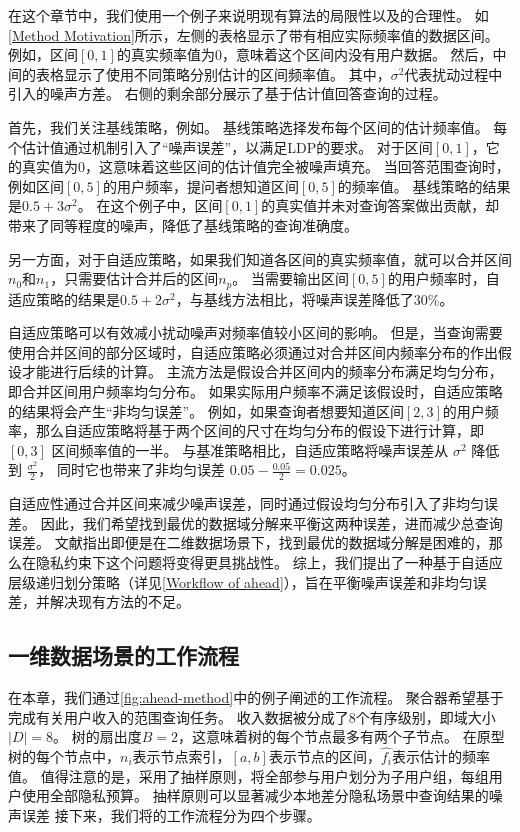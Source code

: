 在这个章节中，我们使用一个例子来说明现有算法的局限性以及\myahead 的合理性。
如\autoref{Method Motivation}所示，左侧的表格显示了带有相应实际频率值的数据区间。
例如，区间$[0,1]$的真实频率值为$0$，意味着这个区间内没有用户数据。
然后，中间的表格显示了使用不同策略分别估计的区间频率值。
其中，$\sigma^2$代表扰动过程中引入的噪声方差。
右侧的剩余部分展示了基于估计值回答查询的过程。

首先，我们关注基线策略，例如\myhio。
基线策略选择发布每个区间的估计频率值。
每个估计值通过\fo 机制引入了“噪声误差”，以满足LDP的要求。
对于区间$[0,1]$，它的真实值为$0$，这意味着这些区间的估计值完全被噪声填充。
当回答范围查询时，例如区间$[0,5]$的用户频率，提问者想知道区间$[0,5]$的频率值。
基线策略的结果是$0.5 + 3\sigma^2$。
在这个例子中，区间$[0,1]$的真实值并未对查询答案做出贡献，却带来了同等程度的噪声，降低了基线策略的查询准确度。

另一方面，对于自适应策略，如果我们知道各区间的真实频率值，就可以合并区间$n_0$和$n_1$，只需要估计合并后的区间$n_p$。
当需要输出区间$[0,5]$的用户频率时，自适应策略的结果是$0.5 + 2\sigma^2$，与基线方法相比，将噪声误差降低了30\%。

自适应策略可以有效减小扰动噪声对频率值较小区间的影响。
但是，当查询需要使用合并区间的部分区域时，自适应策略必须通过对合并区间内频率分布的作出假设才能进行后续的计算。
主流方法是假设合并区间内的频率分布满足均匀分布\cite{ioannidis2003history}，即合并区间用户频率均匀分布。
如果实际用户频率不满足该假设时，自适应策略的结果将会产生“非均匀误差”。
例如，如果查询者想要知道区间$[2,3]$的用户频率，那么自适应策略将基于两个区间的尺寸在均匀分布的假设下进行计算，即 $[0,3]$ 区间频率值的一半。
与基准策略相比，自适应策略将噪声误差从 $\sigma^2$ 降低到 $\frac{\sigma^2}{2}$，
同时它也带来了非均匀误差 $0.05 - \frac{0.05}{2} = 0.025$。

自适应性通过合并区间来减少噪声误差，同时通过假设均匀分布引入了非均匀误差。
因此，我们希望找到最优的数据域分解来平衡这两种误差，进而减少总查询误差。
文献\cite{muthukrishnan1999rectangular}指出即便是在二维数据场景下，找到最优的数据域分解是困难的，那么在隐私约束下这个问题将变得更具挑战性。 
综上，我们提出了一种基于自适应层级递归划分策略（详见\autoref{Workflow of ahead}），旨在平衡噪声误差和非均匀误差，并解决现有方法的不足。

\subsection{一维数据场景\myahead 的工作流程}
\label{Workflow of ahead}
在本章，我们通过\autoref{fig:ahead-method}中的例子阐述\myahead 的工作流程。
聚合器希望基于\myahead 完成有关用户收入的范围查询任务。
收入数据被分成了8个有序级别，即域大小$|D|=8$。
树的扇出度$B=2$，这意味着\myahead 树的每个节点最多有两个子节点。
在\myahead 原型树的每个节点中，$n_i$表示节点索引，$[a,b]$表示节点的区间，$\hat{f_i}$表示估计的频率值。
值得注意的是，\myahead 采用了抽样原则\cite{cormode2019answering}，将全部参与用户划分为子用户组，每组用户使用全部隐私预算。
抽样原则可以显著减少本地差分隐私场景中查询结果的噪声误差\cite{nguyen2016collecting, wang2017locally, wang2019locally}
接下来，我们将\myahead 的工作流程分为四个步骤。


